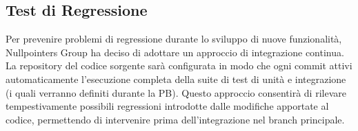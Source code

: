 \subsection{Test di Regressione}
Per prevenire problemi di regressione durante lo sviluppo di nuove funzionalità, Nullpointers Group ha deciso di adottare un approccio di integrazione continua.
La repository del codice sorgente sarà configurata in modo che ogni commit attivi automaticamente l'esecuzione completa della suite di test di unità e integrazione (i quali verranno definiti durante la PB).
Questo approccio consentirà di rilevare tempestivamente possibili regressioni introdotte dalle modifiche apportate al codice, permettendo di intervenire prima dell'integrazione nel branch principale.